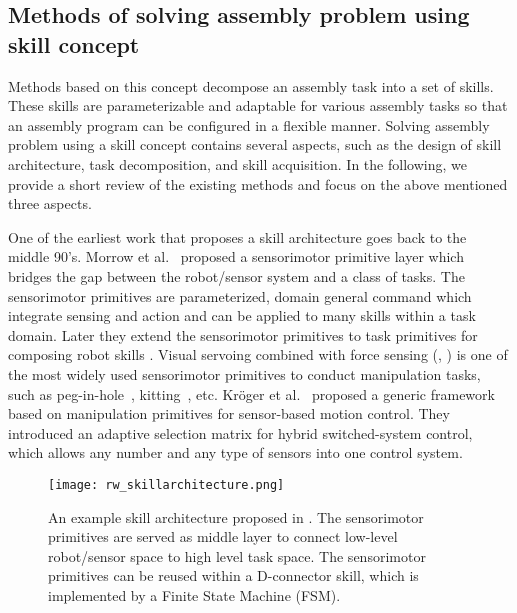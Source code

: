 \subsection{Methods of solving assembly problem using skill concept}
Methods based on this concept decompose an assembly task into a set of skills. These skills are parameterizable and adaptable for various assembly tasks so that an assembly program can be configured in a flexible manner. Solving assembly problem using a skill concept contains several aspects, such as the design of skill architecture, task decomposition, and skill acquisition. In the following, we provide a short review of the existing methods and focus on the above mentioned three aspects.

One of the earliest work that proposes a skill architecture goes back to the middle 90's. Morrow et al.~\cite{Morrow1995} proposed a sensorimotor primitive layer which bridges the gap between the robot/sensor system and a class of tasks. The sensorimotor primitives are parameterized, domain general command which integrate sensing and action and can be applied to many skills within a task domain. Later they extend the sensorimotor primitives to task primitives for composing robot skills \cite{Morrow1997}. Visual servoing combined with force sensing (\cite{Nelson1996}, \cite{Lopez-Juarez2005}) is one of the most widely used sensorimotor primitives to conduct manipulation tasks, such as peg-in-hole~\cite{Brignone2002}, kitting~\cite{Holz2015}, etc. Kr\"oger et al.~\cite{Kroger2010} proposed a generic framework based on manipulation primitives for sensor-based motion control. They introduced an adaptive selection matrix for hybrid switched-system control, which allows any number and any type of sensors into one control system. 
\begin{figure}[!htbp]
\centering
\texttt{[image: rw\_skillarchitecture.png]}
\captionsetup{justification=raggedright}
\caption{An example skill architecture proposed in \cite{Morrow1995}. The sensorimotor primitives are served as middle layer to connect low-level robot/sensor space to high level task space. The sensorimotor primitives can be reused within a D-connector skill, which is implemented by a Finite State Machine (FSM). }
\label{fig:rw_skillarchitecture}       %
\end{figure} 

